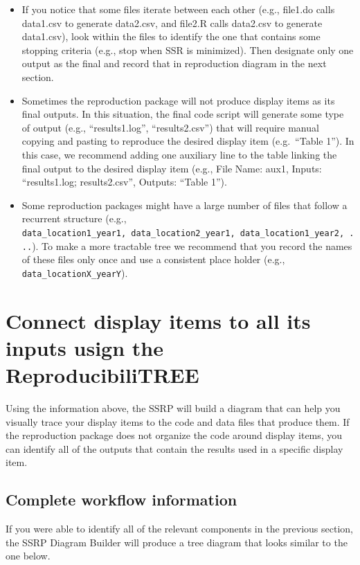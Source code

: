 \documentclass[
]{book}
\begin{document}
\begin{itemize}
\item
  If you notice that some files iterate between each other (e.g., file1.do calls data1.csv to generate data2.csv, and file2.R calls data2.csv to generate data1.csv), look within the files to identify the one that contains some stopping criteria (e.g., stop when SSR is minimized). Then designate only one output as the final and record that in reproduction diagram in the next section.
\item
  Sometimes the reproduction package will not produce display items as its final outputs. In this situation, the final code script will generate some type of output (e.g., ``results1.log'', ``results2.csv'') that will require manual copying and pasting to reproduce the desired display item (e.g.~``Table 1''). In this case, we recommend adding one auxiliary line to the table linking the final output to the desired display item (e.g., File Name: aux1, Inputs: ``results1.log; results2.csv'', Outputs: ``Table 1'').
\item
  Some reproduction packages might have a large number of files that follow a recurrent structure (e.g., \texttt{data\_location1\_year1,\ data\_location2\_year1,\ data\_location1\_year2,\ ...}). To make a more tractable tree we recommend that you record the names of these files only once and use a consistent place holder (e.g., \texttt{data\_locationX\_yearY}).
\end{itemize}

\hypertarget{diagram}{%
\section{Connect display items to all its inputs usign the ReproducibiliTREE}\label{diagram}}

Using the information above, the SSRP will build a diagram that can help you visually trace your display items to the code and data files that produce them. If the reproduction package does not organize the code around display items, you can identify all of the outputs that contain the results used in a specific display item.

\hypertarget{complete-tree}{%
\subsection{Complete workflow information}\label{complete-tree}}

If you were able to identify all of the relevant components in the previous section, the SSRP Diagram Builder will produce a tree diagram that looks similar to the one below.
\end{document}
